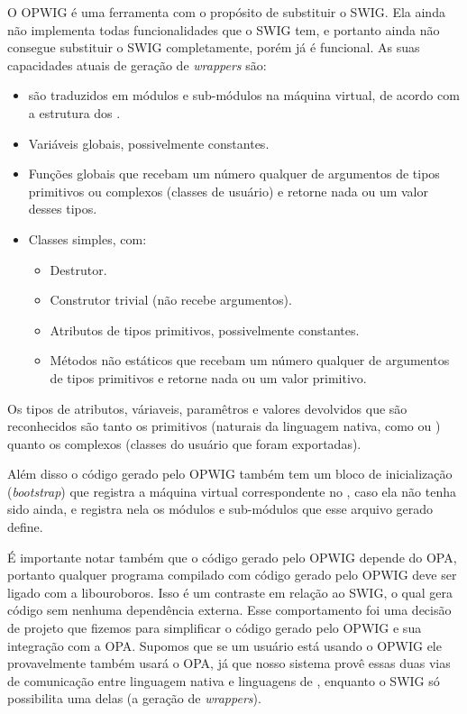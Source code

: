 O OPWIG é uma ferramenta com o propósito de substituir o SWIG.
Ela ainda não implementa todas funcionalidades que o SWIG tem, e portanto
ainda não consegue substituir o SWIG completamente, porém já é funcional.
As suas capacidades atuais de geração de \textit{wrappers} são:
\begin{itemize}
  \item {} são traduzidos em módulos e sub-módulos na máquina
    virtual, de acordo com a estrutura dos .
  \item Variáveis globais, possivelmente constantes.
  \item Funções globais que recebam um número qualquer de argumentos de tipos
    primitivos ou complexos (classes de usuário) e retorne nada ou um valor desses tipos.
  \item Classes simples, com:
    \begin{itemize}
      \item Destrutor.
      \item Construtor trivial (não recebe argumentos).
      \item Atributos de tipos primitivos, possivelmente constantes.
      \item Métodos não estáticos que recebam um número qualquer de argumentos
        de tipos primitivos e retorne nada ou um valor primitivo.
    \end{itemize}
\end{itemize}
Os tipos de atributos, váriaveis, paramêtros e valores devolvidos que são reconhecidos
são tanto os primitivos (naturais da linguagem nativa, como  ou )
quanto os complexos (classes do usuário que foram exportadas).

Além disso o código gerado pelo OPWIG também tem um bloco de inicialização
(\textit{bootstrap}) que registra a máquina virtual correspondente no \SMgr{},
caso ela não tenha sido ainda, e registra nela os módulos e sub-módulos que esse
arquivo gerado define.

É importante notar também que o código gerado pelo OPWIG depende do OPA, 
portanto qualquer programa compilado com código gerado pelo OPWIG deve ser
ligado com a libouroboros. Isso é um contraste em relação ao SWIG, o qual gera
código sem nenhuma dependência externa. Esse comportamento foi uma decisão de
projeto que fizemos para simplificar o código gerado pelo OPWIG e sua integração
com a OPA. Supomos que se um usuário está usando o OPWIG ele provavelmente
também usará o OPA, já que nosso sistema provê essas duas vias de comunicação
entre linguagem nativa e linguagens de \script{}, enquanto o SWIG só possibilita
uma delas (a geração de \textit{wrappers}).

